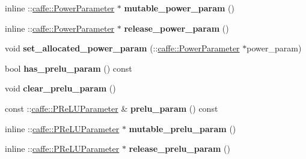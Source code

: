 \begin{DoxyCompactItemize}
\mbox{\label{classcaffe_1_1_layer_parameter_a339c43c7f9269f0c06af1f6996b4b1a0}} 
inline \+::\mbox{\hyperlink{classcaffe_1_1_power_parameter}{caffe\+::\+Power\+Parameter}} $\ast$ {\bfseries mutable\+\_\+power\+\_\+param} ()
\item 
\mbox{\label{classcaffe_1_1_layer_parameter_a21acd6f20b9aafdd221bc9ab4c93eec9}} 
inline \+::\mbox{\hyperlink{classcaffe_1_1_power_parameter}{caffe\+::\+Power\+Parameter}} $\ast$ {\bfseries release\+\_\+power\+\_\+param} ()
\item 
\mbox{\label{classcaffe_1_1_layer_parameter_ad7ffedf703a12380a55cb384617fdde2}} 
void {\bfseries set\+\_\+allocated\+\_\+power\+\_\+param} (\+::\mbox{\hyperlink{classcaffe_1_1_power_parameter}{caffe\+::\+Power\+Parameter}} $\ast$power\+\_\+param)
\item 
\mbox{\label{classcaffe_1_1_layer_parameter_a5b75274e94967ccef8e96b78a96899c4}} 
bool {\bfseries has\+\_\+prelu\+\_\+param} () const
\item 
\mbox{\label{classcaffe_1_1_layer_parameter_af536abc88a277ffd709ec0c48ef2faf6}} 
void {\bfseries clear\+\_\+prelu\+\_\+param} ()
\item 
\mbox{\label{classcaffe_1_1_layer_parameter_aa42a17b37cf53598515df7aebf1bd626}} 
const \+::\mbox{\hyperlink{classcaffe_1_1_p_re_l_u_parameter}{caffe\+::\+P\+Re\+L\+U\+Parameter}} \& {\bfseries prelu\+\_\+param} () const
\item 
\mbox{\label{classcaffe_1_1_layer_parameter_abba47c120e3c44f4a4418aa18696e941}} 
inline \+::\mbox{\hyperlink{classcaffe_1_1_p_re_l_u_parameter}{caffe\+::\+P\+Re\+L\+U\+Parameter}} $\ast$ {\bfseries mutable\+\_\+prelu\+\_\+param} ()
\item 
\mbox{\label{classcaffe_1_1_layer_parameter_a542a43ef7587bc24d4f63107697ab3a0}} 
inline \+::\mbox{\hyperlink{classcaffe_1_1_p_re_l_u_parameter}{caffe\+::\+P\+Re\+L\+U\+Parameter}} $\ast$ {\bfseries release\+\_\+prelu\+\_\+param} ()
\item 

\end{DoxyCompactItemize}
